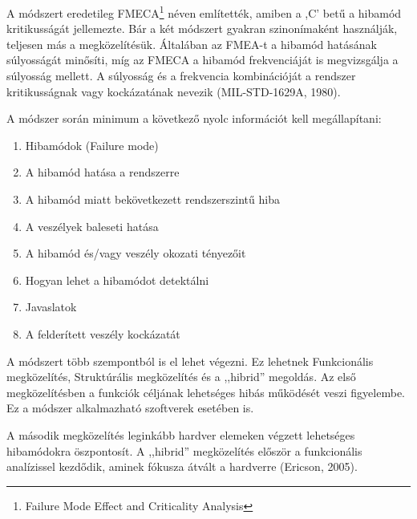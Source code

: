 A módszert eredetileg FMECA\footnote{Failure Mode Effect and Criticality Analysis} néven említették, amiben a ,C' betű a hibamód kritikusságát jellemezte.
Bár a két módszert gyakran szinonímaként használják, teljesen más a megközelítésük.
Általában az FMEA-t a hibamód hatásának súlyosságát minősíti, míg az FMECA a hibamód frekvenciáját is megvizsgálja a súlyosság mellett.
A súlyosság és a frekvencia kombinációját a rendszer kritikusságnak vagy kockázatának nevezik (MIL-STD-1629A, 1980).

A módszer során minimum a következő nyolc információt kell megállapítani:
\begin{enumerate}
    \item Hibamódok (Failure mode)
    \item A hibamód hatása a rendszerre
    \item A hibamód miatt bekövetkezett rendszerszintű hiba
    \item A veszélyek baleseti hatása
    \item A hibamód és/vagy veszély okozati tényezőit
    \item Hogyan lehet a hibamódot detektálni
    \item Javaslatok
    \item A felderített veszély kockázatát
\end{enumerate}

A módszert több szempontból is el lehet végezni.
Ez lehetnek Funkcionális megközelítés, Struktúrális megközelítés és a ,,hibrid'' megoldás.
Az első megközelítésben a funkciók céljának lehetséges hibás működését veszi figyelembe.
Ez a módszer alkalmazható szoftverek esetében is.

A második megközelítés leginkább hardver elemeken végzett lehetséges hibamódokra öszpontosít.
A ,,hibrid'' megközelítés először a funkcionális analízissel kezdődik, aminek fókusza átvált a hardverre (Ericson, 2005).

